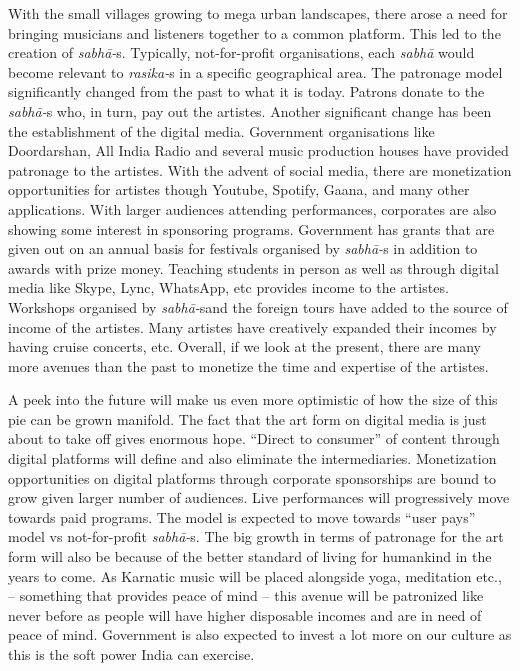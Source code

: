 With the small villages growing to mega urban landscapes, there arose a need for bringing musicians and listeners together to a common platform. This led to the creation of \textit{sabhā-}s. Typically, not-for-profit organisations, each \textit{sabhā} would become relevant to\textit{ rasika-}s in a specific geographical area. The patronage model significantly changed from the past to what it is today. Patrons donate to the \textit{sabhā-}s who, in turn, pay out the artistes. Another significant change has been the establishment of the digital media. Government organisations like Doordarshan, All India Radio and several music production houses have provided patronage to the artistes. With the advent of social media, there are monetization opportunities for artistes though Youtube, Spotify, Gaana, and many other applications. With larger audiences attending performances, corporates are also showing some interest in sponsoring programs. Government has grants that are given out on an annual basis for festivals organised by \textit{sabhā-}s in addition to awards with prize money. Teaching students in person as well as through digital media like Skype, Lync, WhatsApp, etc provides income to the artistes. Workshops organised by \textit{sabhā-}s\break and the foreign tours have added to the source of income of the artistes. Many artistes have creatively expanded their incomes by having cruise concerts, etc. Overall, if we look at the present, there are many more avenues than the past to monetize the time and expertise of the artistes.

A peek into the future will make us even more optimistic of how the size of this pie can be grown manifold. The fact that the art form on digital media is just about to take off gives enormous hope. “Direct to consumer” of content through digital platforms will define and also eliminate the intermediaries. Monetization opportunities on digital platforms through corporate sponsorships are bound to grow given larger number of audiences. Live performances will progressively move towards paid programs. The model is expected to move towards “user pays” model vs not-for-profit \textit{sabhā-}s. The big growth in terms of patronage for the art form will also be because of the better standard of living for humankind in the years to come. As Karnatic music will be placed alongside yoga, meditation etc., – something that provides peace of mind – this avenue will be patronized like never before as people will have higher disposable incomes and are in need of peace of mind. Government is also expected to invest a lot more on our culture as this is the soft power India can exercise.

